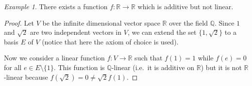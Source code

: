 \documentclass[12pt]{article}
\newcommand{\R}{\mathbb R}
\newcommand{\Q}{\mathbb Q}
\theoremstyle{remark}
\newtheorem{example}{Example}
\begin{document}
\begin{example}
There exists a function $f\colon \R\to\R$ which is additive but not linear.
\end{example}
\begin{proof}
Let $V$ be the infinite dimensional vector space $\R$ over the 
field $\Q$. Since $1$ and $\sqrt 2$ are two independent vectors in $V$, we can extend the set $\{1,\sqrt 2\}$ to a basis $E$ of $V$ (notice that here the axiom of choice is used).

Now we consider a linear function $f\colon V \to \R$ such that $f(1)=1$ while $f(e)=0$ for all $e\in E\setminus\{1\}$. This function is $\Q$-linear (i.e.\ it is additive on $\R$) but it is not $\R$-linear because $f(\sqrt 2)=0\neq \sqrt 2 f(1)$.
\end{proof}
\end{document}
